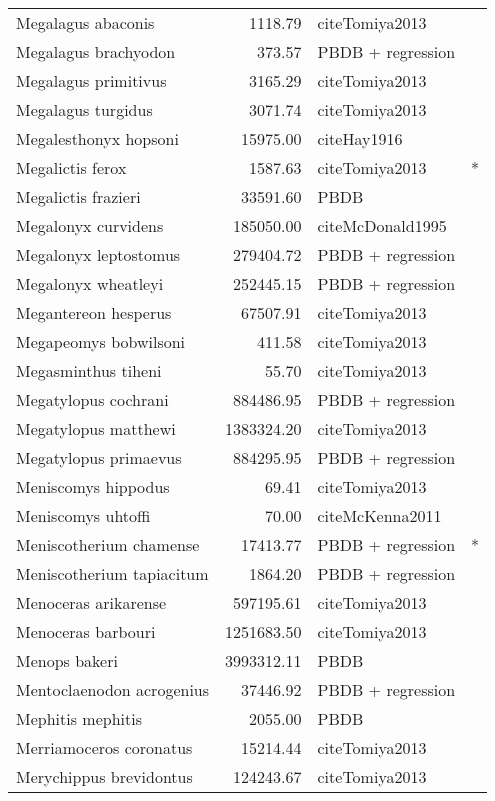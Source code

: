 \begin{table}[ht]
\begin{tabular}{lrll}
  Megalagus abaconis & 1118.79 & cite{Tomiya2013} &  \\ 
  Megalagus brachyodon & 373.57 & PBDB + regression &  \\ 
  Megalagus primitivus & 3165.29 & cite{Tomiya2013} &  \\ 
  Megalagus turgidus & 3071.74 & cite{Tomiya2013} &  \\ 
  Megalesthonyx hopsoni & 15975.00 & cite{Hay1916} &  \\ 
  Megalictis ferox & 1587.63 & cite{Tomiya2013} & * \\ 
  Megalictis frazieri & 33591.60 & PBDB &  \\ 
  Megalonyx curvidens & 185050.00 & cite{McDonald1995} &  \\ 
  Megalonyx leptostomus & 279404.72 & PBDB + regression &  \\ 
  Megalonyx wheatleyi & 252445.15 & PBDB + regression &  \\ 
  Megantereon hesperus & 67507.91 & cite{Tomiya2013} &  \\ 
  Megapeomys bobwilsoni & 411.58 & cite{Tomiya2013} &  \\ 
  Megasminthus tiheni & 55.70 & cite{Tomiya2013} &  \\ 
  Megatylopus cochrani & 884486.95 & PBDB + regression &  \\ 
  Megatylopus matthewi & 1383324.20 & cite{Tomiya2013} &  \\ 
  Megatylopus primaevus & 884295.95 & PBDB + regression &  \\ 
  Meniscomys hippodus & 69.41 & cite{Tomiya2013} &  \\ 
  Meniscomys uhtoffi & 70.00 & cite{McKenna2011} &  \\ 
  Meniscotherium chamense & 17413.77 & PBDB + regression & * \\ 
  Meniscotherium tapiacitum & 1864.20 & PBDB + regression &  \\ 
  Menoceras arikarense & 597195.61 & cite{Tomiya2013} &  \\ 
  Menoceras barbouri & 1251683.50 & cite{Tomiya2013} &  \\ 
  Menops bakeri & 3993312.11 & PBDB &  \\ 
  Mentoclaenodon acrogenius & 37446.92 & PBDB + regression &  \\ 
  Mephitis mephitis & 2055.00 & PBDB &  \\ 
  Merriamoceros coronatus & 15214.44 & cite{Tomiya2013} &  \\ 
  Merychippus brevidontus & 124243.67 & cite{Tomiya2013} &  \\ 

\end{tabular}
\end{table}
